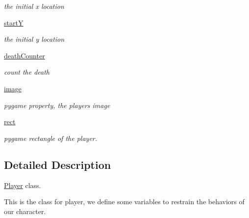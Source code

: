 \begin{DoxyCompactItemize}
\begin{DoxyCompactList}\small\item\em the initial x location \end{DoxyCompactList}\item 
\hyperlink{classplayer_1_1_player_a833a43f5890d48e945e62f7759c7c9f7}{startY}\hypertarget{classplayer_1_1_player_a833a43f5890d48e945e62f7759c7c9f7}{}\label{classplayer_1_1_player_a833a43f5890d48e945e62f7759c7c9f7}

\begin{DoxyCompactList}\small\item\em the initial y location \end{DoxyCompactList}\item 
\hyperlink{classplayer_1_1_player_a51ce2953ea3a60d34f3b21f916d4d122}{death\+Counter}\hypertarget{classplayer_1_1_player_a51ce2953ea3a60d34f3b21f916d4d122}{}\label{classplayer_1_1_player_a51ce2953ea3a60d34f3b21f916d4d122}

\begin{DoxyCompactList}\small\item\em count the death \end{DoxyCompactList}\item 
\hyperlink{classplayer_1_1_player_ac3a2325d576ac612ed8b00f0f61fe55b}{image}\hypertarget{classplayer_1_1_player_ac3a2325d576ac612ed8b00f0f61fe55b}{}\label{classplayer_1_1_player_ac3a2325d576ac612ed8b00f0f61fe55b}

\begin{DoxyCompactList}\small\item\em pygame property, the player\textquotesingle{}s image \end{DoxyCompactList}\item 
\hyperlink{classplayer_1_1_player_a6870facb96e50fe33af1071506c67c69}{rect}
\begin{DoxyCompactList}\small\item\em pygame rectangle of the player. \end{DoxyCompactList}\end{DoxyCompactItemize}


\subsection{Detailed Description}
\hyperlink{classplayer_1_1_player}{Player} class. 

This is the class for player, we define some variables to restrain the behaviors of our character. 


